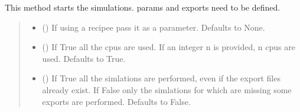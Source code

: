 \documentclass[letterpaper,10pt,english]{sphinxmanual}
\begin{document}
\begin{fulllineitems}
\begin{fulllineitems}
\end{fulllineitems}


\begin{fulllineitems}
\label{\detokenize{code_documentation:raypyng.simulate.Simulate.run}}
\pysigstartsignatures
{}
\pysigstopsignatures
\sphinxAtStartPar
This method starts the simulations. params and exports need to be defined.
\begin{quote}\begin{description}
\begin{itemize}
\item {} 
\sphinxAtStartPar
{} (\sphinxstyleliteralemphasis{\sphinxupquote{, }}) \textendash{} If using a recipee pass it as a parameter. Defaults to None.

\item {} 
\sphinxAtStartPar
{} (\sphinxstyleliteralemphasis{\sphinxupquote{, }}) \textendash{} If True all the cpus are used. If an integer n is provided, n cpus are used. Defaults to True.

\item {} 
\sphinxAtStartPar
{} (\sphinxstyleliteralemphasis{\sphinxupquote{, }}) \textendash{} If True all the simlations are performed, even if the export files already exist. If False only the simlations for which are missing some exports are performed. Defaults to False.

\end{itemize}

\end{description}\end{quote}


\end{fulllineitems}
\end{fulllineitems}
\end{document}
